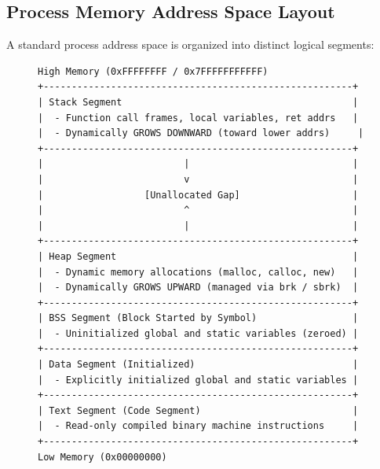 \subsection{Process Memory Address Space Layout}
A standard process address space is organized into distinct logical segments:

\begin{figure}[htbp]
\centering
\begin{tcolorbox}[colback=codebg, colframe=primary, title=\textbf{Standard Process Virtual Memory Architecture}]
\begin{verbatim}
High Memory (0xFFFFFFFF / 0x7FFFFFFFFFFF)
+-------------------------------------------------------+
| Stack Segment                                         |
|  - Function call frames, local variables, ret addrs   |
|  - Dynamically GROWS DOWNWARD (toward lower addrs)     |
+-------------------------------------------------------+
|                         |                             |
|                         v                             |
|                  [Unallocated Gap]                    |
|                         ^                             |
|                         |                             |
+-------------------------------------------------------+
| Heap Segment                                          |
|  - Dynamic memory allocations (malloc, calloc, new)   |
|  - Dynamically GROWS UPWARD (managed via brk / sbrk)  |
+-------------------------------------------------------+
| BSS Segment (Block Started by Symbol)                 |
|  - Uninitialized global and static variables (zeroed) |
+-------------------------------------------------------+
| Data Segment (Initialized)                            |
|  - Explicitly initialized global and static variables |
+-------------------------------------------------------+
| Text Segment (Code Segment)                           |
|  - Read-only compiled binary machine instructions     |
+-------------------------------------------------------+
Low Memory (0x00000000)
\end{verbatim}
\end{tcolorbox}
\end{figure}

